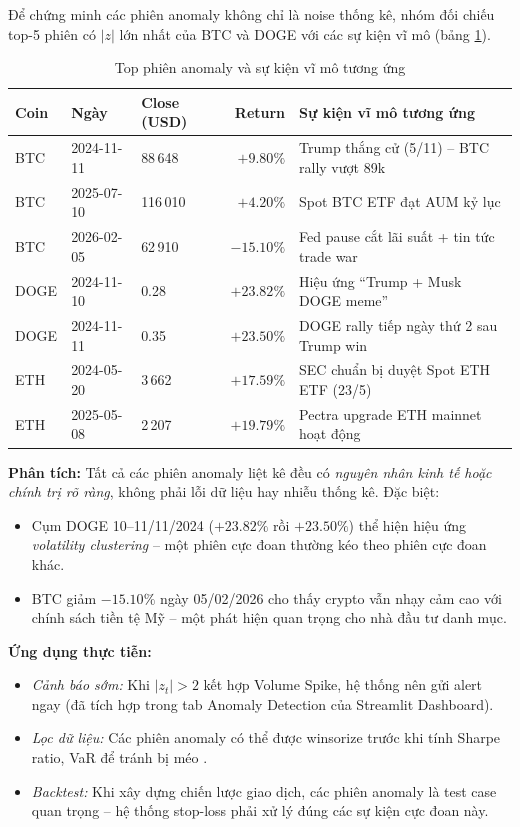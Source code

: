 Để chứng minh các phiên anomaly không chỉ là noise thống kê, nhóm đối chiếu top-5 phiên có $|z|$ lớn nhất của BTC và DOGE với các sự kiện vĩ mô (bảng \ref{tab:anomaly_case_study}).

\begin{table}[H]
\centering
\caption{Top phiên anomaly và sự kiện vĩ mô tương ứng}
\label{tab:anomaly_case_study}
\small
\begin{tabular}{@{}lllrl@{}}
\toprule
\textbf{Coin} & \textbf{Ngày} & \textbf{Close (USD)} & \textbf{Return} & \textbf{Sự kiện vĩ mô tương ứng} \\ \midrule
BTC  & 2024-11-11 & 88\,648  & $+9.80\%$  & Trump thắng cử (5/11) -- BTC rally vượt 89k \\
BTC  & 2025-07-10 & 116\,010 & $+4.20\%$  & Spot BTC ETF đạt AUM kỷ lục \\
BTC  & 2026-02-05 & 62\,910  & $-15.10\%$ & Fed pause cắt lãi suất + tin tức trade war \\
DOGE & 2024-11-10 & 0.28     & $+23.82\%$ & Hiệu ứng ``Trump + Musk DOGE meme'' \\
DOGE & 2024-11-11 & 0.35     & $+23.50\%$ & DOGE rally tiếp ngày thứ 2 sau Trump win \\
ETH  & 2024-05-20 & 3\,662   & $+17.59\%$ & SEC chuẩn bị duyệt Spot ETH ETF (23/5) \\
ETH  & 2025-05-08 & 2\,207   & $+19.79\%$ & Pectra upgrade ETH mainnet hoạt động \\ \bottomrule
\end{tabular}
\end{table}

\textbf{Phân tích:} Tất cả các phiên anomaly liệt kê đều có \emph{nguyên nhân kinh tế hoặc chính trị rõ ràng}, không phải lỗi dữ liệu hay nhiễu thống kê. Đặc biệt:
\begin{itemize}
    \item Cụm DOGE 10--11/11/2024 ($+23.82\%$ rồi $+23.50\%$) thể hiện hiệu ứng \emph{volatility clustering} -- một phiên cực đoan thường kéo theo phiên cực đoan khác.
    \item BTC giảm $-15.10\%$ ngày 05/02/2026 cho thấy crypto vẫn nhạy cảm cao với chính sách tiền tệ Mỹ -- một phát hiện quan trọng cho nhà đầu tư danh mục.
\end{itemize}

\textbf{Ứng dụng thực tiễn:}
\begin{itemize}
    \item \emph{Cảnh báo sớm:} Khi $|z_t| > 2$ kết hợp Volume Spike, hệ thống nên gửi alert ngay (đã tích hợp trong tab Anomaly Detection của Streamlit Dashboard).
    \item \emph{Lọc dữ liệu:} Các phiên anomaly có thể được winsorize trước khi tính Sharpe ratio, VaR để tránh bị méo \cite{cfa2023}.
    \item \emph{Backtest:} Khi xây dựng chiến lược giao dịch, các phiên anomaly là test case quan trọng -- hệ thống stop-loss phải xử lý đúng các sự kiện cực đoan này.
\end{itemize}
